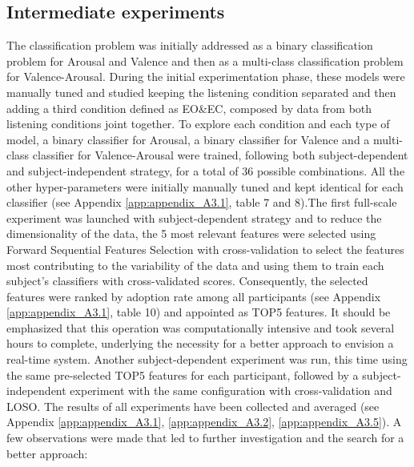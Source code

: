 \subsection{Intermediate experiments}
\label{sec:intermediate_experiments}
The classification problem was initially addressed as a binary classification problem for Arousal and Valence and then as a multi-class classification problem for Valence-Arousal. During the initial experimentation phase, these models were manually tuned and studied keeping the listening condition separated and then adding a third condition defined as EO\&EC, composed by data from both listening conditions joint together. To explore each condition and each type of model, a binary classifier for Arousal, a binary classifier for Valence and a multi-class classifier for Valence-Arousal were trained, following both subject-dependent and subject-independent strategy, for a total of 36 possible combinations. All the other hyper-parameters were initially manually tuned and kept identical for each classifier (see Appendix \ref{app:appendix_A3.1}, table 7 and 8).The first full-scale experiment was launched with subject-dependent strategy and to reduce the dimensionality of the data, the 5 most relevant features were selected using Forward Sequential Features Selection with cross-validation to select the features most contributing to the variability of the data and using them to train each subject’s classifiers with cross-validated scores. Consequently, the selected features were ranked by adoption rate among all participants (see Appendix \ref{app:appendix_A3.1}, table 10) and appointed as TOP5 features. It should be emphasized that this operation was computationally intensive and took several hours to complete, underlying the necessity for a better approach to envision a real-time system. Another subject-dependent experiment was run, this time using the same pre-selected TOP5 features for each participant, followed by a subject-independent experiment with the same configuration with cross-validation and \ac{LOSO}. The results of all experiments have been collected and averaged (see Appendix \ref{app:appendix_A3.1}, \ref{app:appendix_A3.2}, \ref{app:appendix_A3.5}). A few observations were made that led to further investigation and the search for a better approach:
